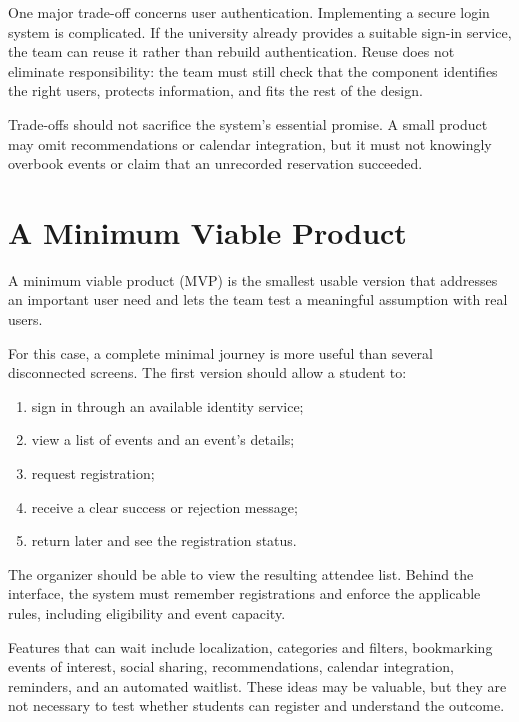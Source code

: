 \documentclass[11pt]{article}
\begin{document}
One major trade-off concerns user authentication. Implementing a secure login system is complicated. If the university already provides a suitable sign-in service, the team can reuse it rather than rebuild authentication. Reuse does not eliminate responsibility: the team must still check that the component identifies the right users, protects information, and fits the rest of the design.

Trade-offs should not sacrifice the system's essential promise. A small product may omit recommendations or calendar integration, but it must not knowingly overbook events or claim that an unrecorded reservation succeeded.

\section{A Minimum Viable Product}

\begin{definition}
A minimum viable product (MVP) is the smallest usable version that addresses an important user need and lets the team test a meaningful assumption with real users.
\end{definition}

For this case, a complete minimal journey is more useful than several disconnected screens. The first version should allow a student to:
\begin{enumerate}
  \item sign in through an available identity service;
  \item view a list of events and an event's details;
  \item request registration;
  \item receive a clear success or rejection message;
  \item return later and see the registration status.
\end{enumerate}

The organizer should be able to view the resulting attendee list. Behind the interface, the system must remember registrations and enforce the applicable rules, including eligibility and event capacity.

Features that can wait include localization, categories and filters, bookmarking events of interest, social sharing, recommendations, calendar integration, reminders, and an automated waitlist. These ideas may be valuable, but they are not necessary to test whether students can register and understand the outcome.
\end{document}
